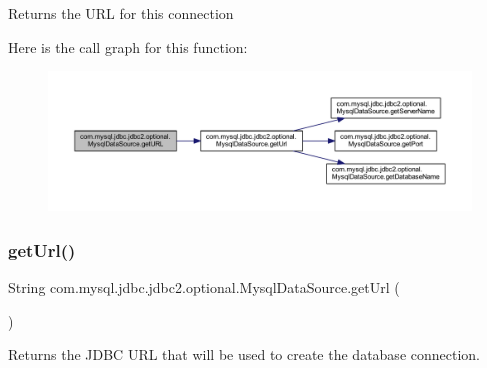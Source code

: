 \begin{DoxyReturn}{Returns}
the U\+RL for this connection 
\end{DoxyReturn}
Here is the call graph for this function\+:
\nopagebreak
\begin{figure}[H]
\begin{center}
\leavevmode
\includegraphics[width=350pt]{classcom_1_1mysql_1_1jdbc_1_1jdbc2_1_1optional_1_1_mysql_data_source_a53c7e30b2c6b71edcd194fd8ecd5ebba_cgraph}
\end{center}
\end{figure}
\mbox{\label{classcom_1_1mysql_1_1jdbc_1_1jdbc2_1_1optional_1_1_mysql_data_source_a5e66ffff5f2e60b902e05cbb12f32a6c}} 
\subsubsection{\texorpdfstring{get\+Url()}{getUrl()}}
{\footnotesize\ttfamily String com.\+mysql.\+jdbc.\+jdbc2.\+optional.\+Mysql\+Data\+Source.\+get\+Url (\begin{DoxyParamCaption}{ }\end{DoxyParamCaption})}

Returns the J\+D\+BC U\+RL that will be used to create the database connection.

